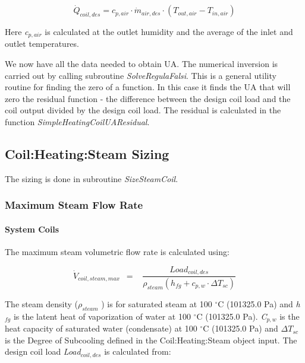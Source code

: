 \begin{equation}
\dot Q_{coil,des} = c_{p,air} \cdot \dot m_{air,des} \cdot (T_{out,air} - T_{in,air})
\end{equation}

Here \emph{c\(_{p,air}\)} is calculated at the outlet humidity and the average of the inlet and outlet temperatures.

We now have all the data needed to obtain UA. The numerical inversion is carried out by calling subroutine \emph{SolveRegulaFalsi}. This is a general utility routine for finding the zero of a function. In this case it finds the UA that will zero the residual function - the difference between the design coil load and the coil output divided by the design coil load. The residual is calculated in the function \emph{SimpleHeatingCoilUAResidual}.

\subsection{Coil:Heating:Steam Sizing}\label{coilheatingsteam-sizing}

The sizing is done in subroutine \emph{SizeSteamCoil}.

\subsubsection{Maximum Steam Flow Rate}\label{maximum-steam-flow-rate}

\paragraph{System Coils}\label{system-coils-2}

The maximum steam volumetric flow rate is calculated using:

\begin{equation}
{\dot V_{coil,steam,max}}\,\,\, = \,\,\,\,\,\frac{{Loa{d_{coil,des}}}}{{{\rho_{steam}}\left( {{h_{fg}} + {c_{p,w}}\cdot \Delta {T_{sc}}} \right)}}
\end{equation}

The steam density (\({\rho_{steam}}\) ) is for saturated steam at 100 \(^{\circ}\)C (101325.0 Pa) and \emph{h\(_{fg}\)} is the latent heat of vaporization of water at 100 \(^{\circ}\)C (101325.0 Pa). \emph{C\(_{p,w}\)} is the heat capacity of saturated water (condensate) at 100 \(^{\circ}\)C (101325.0 Pa) and \(\Delta {T_{sc}}\) is the Degree of Subcooling defined in the Coil:Heating:Steam object input. The design coil load \emph{Load\(_{coil,des}\)} is calculated from:


